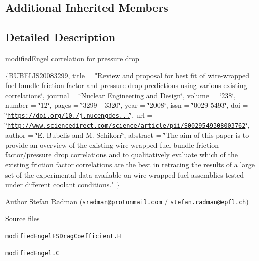 \subsection*{Additional Inherited Members}


\subsection{Detailed Description}
\hyperlink{classFoam_1_1FSDragCoefficientModels_1_1modifiedEngel}{modified\+Engel} correlation for pressure drop 

\label{_Description}%
 \{B\+U\+B\+E\+L\+I\+S20083299, title = "Review and proposal for best fit of wire-\/wrapped fuel bundle friction factor and pressure drop predictions using various existing correlations\char`\"{},
journal = \char`\"{}Nuclear Engineering and Design\char`\"{},
volume = \char`\"{}238\char`\"{},
number = \char`\"{}12\char`\"{},
pages = \char`\"{}3299 -\/ 3320\char`\"{},
year = \char`\"{}2008\char`\"{},
issn = \char`\"{}0029-\/5493\char`\"{},
doi = \char`\"{}\href{https://doi.org/10.1016/j.nucengdes.2008.06.024}{\tt https\+://doi.\+org/10./j.\+nucengdes...}\char`\"{},
url = \char`\"{}\href{http://www.sciencedirect.com/science/article/pii/S0029549308003762}{\tt http\+://www.\+sciencedirect.\+com/science/article/pii/\+S0029549308003762}\char`\"{},
author = \char`\"{}E. Bubelis and M. Schikorr\char`\"{},
abstract = \char`\"{}The aim of this paper is to provide an overview of the existing wire-\/wrapped fuel bundle friction factor/pressure drop correlations and to qualitatively evaluate which of the existing friction factor correlations are the best in retracing the results of a large set of the experimental data available on wire-\/wrapped fuel assemblies tested under different coolant conditions." \}

Author Stefan Radman (\href{mailto:sradman@protonmail.com}{\tt sradman@protonmail.\+com} / \href{mailto:stefan.radman@epfl.ch}{\tt stefan.\+radman@epfl.\+ch})

\begin{DoxyParagraph}{Source files}

\begin{DoxyItemize}
\item \href{../../../home/carlo/data/GeN-Foam/GeN-Foam_ffn/GeN-Foam/GeN-Foam/classes/thermalHydraulics/src/physicsModels/dragModels/FSDragCoefficientModels/modifiedEngel/modifiedEngelFSDragCoefficient.H}{\tt modified\+Engel\+F\+S\+Drag\+Coefficient.\+H} 
\item \href{../../../home/carlo/data/GeN-Foam/GeN-Foam_ffn/GeN-Foam/GeN-Foam/classes/thermalHydraulics/src/physicsModels/dragModels/FSDragCoefficientModels/modifiedEngel/modifiedEngel.C}{\tt modified\+Engel.\+C} 
\end{DoxyItemize}
\end{DoxyParagraph}


